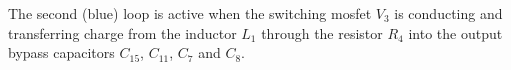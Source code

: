 The second (blue) loop is active when the switching mosfet $V_3$ is conducting
and transferring  charge from  the inductor $L_1$  through the  resistor $R_4$
into the output bypass capacitors $C_{15}$, $C_{11}$, $C_7$ and $C_8$.




